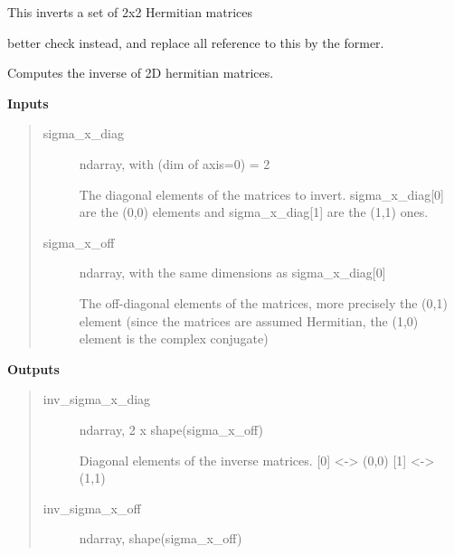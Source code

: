 \documentclass[letterpaper,10pt,english]{sphinxmanual}
\begin{document}
\begin{fulllineitems}
\label{reference/tools:pyfasst.tools.signalTools.invHermMat2D}
This inverts a set of 2x2 Hermitian matrices

better check {\hyperref[reference/tools:pyfasst.tools.signalTools.inv_herm_mat_2d]{}} instead, and replace all
reference to this by the former.

\end{fulllineitems}


\begin{fulllineitems}
\label{reference/tools:pyfasst.tools.signalTools.inv_herm_mat_2d}
Computes the inverse of 2D hermitian matrices.

\textbf{Inputs}
\begin{quote}
\begin{description}
\item[{sigma\_x\_diag}] \leavevmode
ndarray, with (dim of axis=0) = 2

The diagonal elements of the matrices to invert.
sigma\_x\_diag{[}0{]} are the (0,0) elements and
sigma\_x\_diag{[}1{]} are the (1,1) ones.

\item[{sigma\_x\_off}] \leavevmode
ndarray, with the same dimensions as sigma\_x\_diag{[}0{]}

The off-diagonal elements of the matrices, more precisely the
(0,1) element (since the matrices are assumed Hermitian,
the (1,0) element is the complex conjugate)

\end{description}
\end{quote}

\textbf{Outputs}
\begin{quote}
\begin{description}
\item[{inv\_sigma\_x\_diag}] \leavevmode
ndarray, 2 x shape(sigma\_x\_off)

Diagonal elements of the inverse matrices.
{[}0{]} \textless{}-\textgreater{} (0,0)
{[}1{]} \textless{}-\textgreater{} (1,1)

\item[{inv\_sigma\_x\_off}] \leavevmode
ndarray, shape(sigma\_x\_off)


\end{description}
\end{quote}
\end{fulllineitems}
\end{document}
